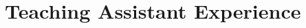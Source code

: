 \documentclass[12pt,a4paper,sans,colorlinks]{moderncv}        %
\begin{document}
\begin{itemize}



 
% 

\end{itemize}

\section{Teaching Assistant Experience}
\end{document}

